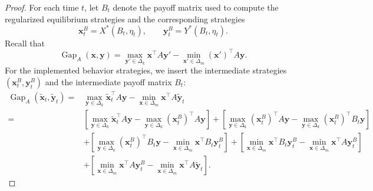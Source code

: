 \documentclass[12pt]{article}
\begin{document}
\begin{proof}
For each time $t$, let $B_t$ denote the payoff matrix used to compute the
regularized equilibrium strategies and the corresponding strategies
\[
\bm x_t^B
=
X^\ast(B_t,\eta_t),
\qquad
\bm y_t^B
=
Y^\ast(B_t,\eta_t).
\]
Recall that
\[
\operatorname{Gap}_A(\bm x,\bm y)
=
\max_{\bm y'\in\Delta_k}
\bm x^\top A\bm y'
-
\min_{\bm x'\in\Delta_m}
(\bm x')^\top A\bm y.
\]
For the implemented behavior strategies, we insert the intermediate strategies
$(\bm x_t^B,\bm y_t^B)$ and the intermediate payoff matrix $B_t$:
\begin{align*}
\operatorname{Gap}_A
\left(
\widetilde{\bm x}_t,\widetilde{\bm y}_t
\right)
=&
\max_{\bm y\in\Delta_k}
\widetilde{\bm x}_t^\top A\bm y
-
\min_{\bm x\in\Delta_m}
\bm x^\top A\widetilde{\bm y}_t
\\
=&
\left[
\max_{\bm y\in\Delta_k}
\widetilde{\bm x}_t^\top A\bm y
-
\max_{\bm y\in\Delta_k}
(\bm x_t^B)^\top A\bm y
\right]
+
\left[
\max_{\bm y\in\Delta_k}
(\bm x_t^B)^\top A\bm y
-
\max_{\bm y\in\Delta_k}
(\bm x_t^B)^\top B_t\bm y
\right]
\\
&+
\left[
\max_{\bm y\in\Delta_k}
(\bm x_t^B)^\top B_t\bm y
-
\min_{\bm x\in\Delta_m}
\bm x^\top B_t\bm y_t^B
\right]
+
\left[
\min_{\bm x\in\Delta_m}
\bm x^\top B_t\bm y_t^B
-
\min_{\bm x\in\Delta_m}
\bm x^\top A\bm y_t^B
\right]
\\
&+
\left[
\min_{\bm x\in\Delta_m}
\bm x^\top A\bm y_t^B
-
\min_{\bm x\in\Delta_m}
\bm x^\top A\widetilde{\bm y}_t
\right].
\end{align*}


\end{proof}
\end{document}
